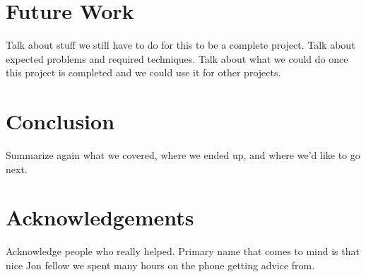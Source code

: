\documentclass[a4paper,twocolumn]{article}
\begin{document}
\section{Future Work}
Talk about stuff we still have to do for this to be a complete project.  Talk
about expected problems and required techniques.  Talk about what we could do
once this project is completed and we could use it for other projects.

\section{Conclusion}
Summarize again what we covered, where we ended up, and where we'd like to go
next.



\section*{Acknowledgements}

Acknowledge people who really helped.  Primary name that comes to mind is that
nice Jon fellow we spent many hours on the phone getting advice from.
\end{document}
